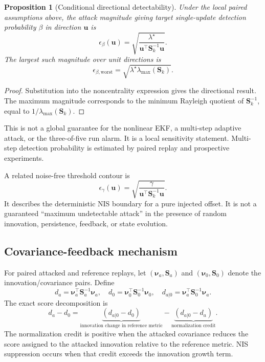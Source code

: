 \documentclass[11pt,a4paper]{article}
\newtheorem{proposition}{Proposition}
\begin{document}
\begin{proposition}[Conditional directional detectability]
\label{prop:detectability}
Under the local paired assumptions above, the attack magnitude giving target
single-update detection probability $\beta$ in direction $\mathbf u$ is
\[
\epsilon_\beta(\mathbf u)
=\sqrt{\frac{\lambda^\star}
{\mathbf u^\top\mathbf S_k^{-1}\mathbf u}}.
\]
The largest such magnitude over unit directions is
\[
\epsilon_{\beta,\mathrm{worst}}
=\sqrt{\lambda^\star\lambda_{\max}(\mathbf S_k)}.
\]
\end{proposition}

\begin{proof}
Substitution into the noncentrality expression gives the directional result.
The maximum magnitude corresponds to the minimum Rayleigh quotient of
$\mathbf S_k^{-1}$, equal to
$1/\lambda_{\max}(\mathbf S_k)$.
\end{proof}

This is not a global guarantee for the nonlinear EKF, a multi-step adaptive
attack, or the three-of-five run alarm. It is a local sensitivity statement.
Multi-step detection probability is estimated by paired replay and prospective
experiments.

A related noise-free threshold contour is
\[
\epsilon_\gamma(\mathbf u)
=\sqrt{\frac{\gamma}{\mathbf u^\top\mathbf S_k^{-1}\mathbf u}}.
\]
It describes the deterministic NIS boundary for a pure injected offset. It is
not a guaranteed ``maximum undetectable attack'' in the presence of random
innovation, persistence, feedback, or state evolution.

\subsection{Covariance-feedback mechanism}

For paired attacked and reference replays, let
$(\boldsymbol\nu_a,\mathbf S_a)$ and
$(\boldsymbol\nu_0,\mathbf S_0)$ denote the innovation/covariance pairs. Define
\[
d_a=\boldsymbol\nu_a^\top\mathbf S_a^{-1}\boldsymbol\nu_a,\quad
d_0=\boldsymbol\nu_0^\top\mathbf S_0^{-1}\boldsymbol\nu_0,\quad
d_{a|0}=\boldsymbol\nu_a^\top\mathbf S_0^{-1}\boldsymbol\nu_a.
\]
The exact score decomposition is
\[
d_a-d_0=
\underbrace{(d_{a|0}-d_0)}_{\text{innovation change in reference metric}}
-
\underbrace{(d_{a|0}-d_a)}_{\text{normalization credit}}.
\]
The normalization credit is positive when the attacked covariance reduces the
score assigned to the attacked innovation relative to the reference metric.
NIS suppression occurs when that credit exceeds the innovation growth term.
\end{document}
